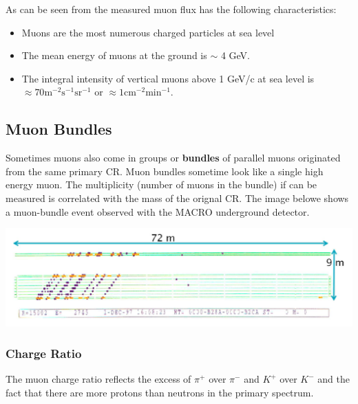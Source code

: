 \documentclass[
  letterpaper,
  DIV=11,
  numbers=noendperiod]{scrreprt}
\providecommand{\tightlist}{%
  \setlength{\itemsep}{0pt}\setlength{\parskip}{0pt}}\usepackage{longtable,booktabs,array}
\begin{document}
As can be seen from the measured muon flux has the following
characteristics:

\begin{itemize}
\tightlist
\item
  Muons are the most numerous charged particles at sea level
\item
  The mean energy of muons at the ground is \(\sim\) 4 GeV.
\item
  The integral intensity of vertical muons above 1 GeV/c at sea level is
  \(\approx 70 \mathrm{m}^{-2} \mathrm{s}^{-1} \mathrm{sr}^{-1}\) or
  \(\approx 1 \mathrm{cm}^{-2} \mathrm{min}^{-1}\).
\end{itemize}

\subsection{Muon Bundles}\label{muon-bundles}

Sometimes muons also come in groups or \textbf{bundles} of parallel
muons originated from the same primary CR. Muon bundles sometime look
like a single high energy muon. The multiplicity (number of muons in the
bundle) if can be measured is correlated with the mass of the orignal
CR. The image belowe shows a muon-bundle event observed with the MACRO
underground detector.

\includegraphics{images/macro-bundle.png}

\subsubsection{Charge Ratio}\label{charge-ratio}

The muon charge ratio reflects the excess of \(\pi^+\) over \(\pi^-\)
and \(K^+\) over \(K^-\) and the fact that there are more protons than
neutrons in the primary spectrum.
\end{document}
